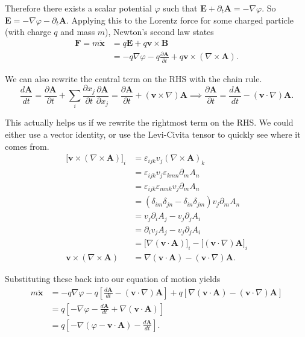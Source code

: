 \documentclass[12pt]{revtex4-2}
\begin{document}
Therefore there exists a scalar potential $\varphi$ such that $\mathbf{E} + \partial_t\mathbf{A} = -\nabla\varphi$.  So $\mathbf{E} = -\nabla\varphi - \partial_t\mathbf{A}$.  Applying this to the Lorentz force for some charged particle (with charge $q$ and mass $m$), Newton's second law states
\begin{align}
    \mathbf{F} = m\ddot{\mathbf{x}} &= q\mathbf{E} + q\mathbf{v}\times\mathbf{B} \\
    &= -q\nabla\varphi - q\frac{\partial \mathbf{A}}{\partial t} + q\mathbf{v}\times(\nabla \times \mathbf{A}).
\end{align}

We can also rewrite the central term on the RHS with the chain rule.
\begin{equation}
    \frac{d\mathbf{A}}{dt} = \frac{\partial \mathbf{A}}{\partial t} + \sum_i \frac{\partial x_j}{\partial t}\frac{\partial \mathbf{A}}{\partial x_j} = \frac{\partial \mathbf{A}}{\partial t} + (\mathbf{v} \times \nabla)\mathbf{A} \implies \frac{\partial \mathbf{A}}{\partial t} = \frac{d\mathbf{A}}{dt} - (\mathbf{v} \cdot \nabla)\mathbf{A}.
\end{equation}

This actually helps us if we rewrite the rightmost term on the RHS.  We could either use a vector identity, or use the Levi-Civita tensor to quickly see where it comes from.
\begin{align}
    \big[\mathbf{v}\times(\nabla \times \mathbf{A})\big]_i &= \varepsilon_{ijk}v_j(\nabla \times \mathbf{A})_k \\
    &= \varepsilon_{ijk}v_j\varepsilon_{kmn}\partial_m A_n \\
    &= \varepsilon_{ijk}\varepsilon_{mnk}v_j\partial_m A_n \\
    &= (\delta_{im}\delta_{jn} - \delta_{in}\delta_{jm})v_j\partial_m A_n \\
    &= v_j\partial_i A_j - v_j\partial_j A_i \\
    &= \partial_iv_j A_j - v_j\partial_j A_i \\
    &= \big[ \nabla(\mathbf{v} \cdot \mathbf{A}) \big]_i - \big[ (\mathbf{v}\cdot\nabla) \mathbf{A} \big]_i \\
    \mathbf{v}\times(\nabla \times \mathbf{A}) &= \nabla (\mathbf{v} \cdot \mathbf{A}) - (\mathbf{v}\cdot\nabla) \mathbf{A}.
\end{align}

Substituting these back into our equation of motion yields
\begin{align}
    m\ddot{\mathbf{x}} &= -q\nabla\varphi - q\left[ \frac{d\mathbf{A}}{dt} - (\mathbf{v} \cdot \nabla)\mathbf{A} \right] + q\left[ \nabla(\mathbf{v} \cdot \mathbf{A}) - (\mathbf{v}\cdot\nabla) \mathbf{A} \right] \\
    &= q\left[ -\nabla\varphi - \frac{d\mathbf{A}}{dt} + \nabla(\mathbf{v} \cdot \mathbf{A}) \right] \\
    &= q\left[ -\nabla\left( \varphi - \mathbf{v}\cdot\mathbf{A} \right) - \frac{d\mathbf{A}}{dt} \right]. \label{eqn:em-eom}
\end{align}
\end{document}
